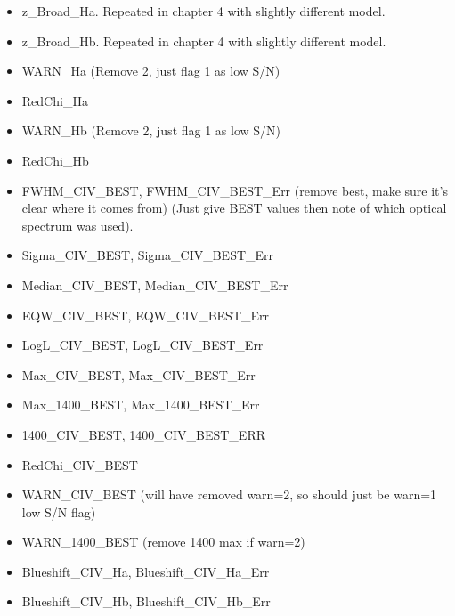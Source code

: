 \begin{itemize}
  \item[] z\_Broad\_Ha. Repeated in chapter 4 with slightly different model.

  \item[] z\_Broad\_Hb. Repeated in chapter 4 with slightly different model. 

  \item[] WARN\_Ha (Remove 2, just flag 1 as low S/N)

  \item[] RedChi\_Ha

  \item[] WARN\_Hb (Remove 2, just flag 1 as low S/N)

  \item[] RedChi\_Hb

  \item[] FWHM\_CIV\_BEST, FWHM\_CIV\_BEST\_Err (remove best, make sure it's clear where it comes from) (Just give BEST values then note of which optical spectrum was used). 

  \item[] Sigma\_CIV\_BEST, Sigma\_CIV\_BEST\_Err

  \item[] Median\_CIV\_BEST, Median\_CIV\_BEST\_Err

  \item[] EQW\_CIV\_BEST, EQW\_CIV\_BEST\_Err

  \item[] LogL\_CIV\_BEST, LogL\_CIV\_BEST\_Err

  \item[] Max\_CIV\_BEST, Max\_CIV\_BEST\_Err   

  \item[] Max\_1400\_BEST, Max\_1400\_BEST\_Err

  \item[] 1400\_CIV\_BEST, 1400\_CIV\_BEST\_ERR

  \item[] RedChi\_CIV\_BEST

  \item[] WARN\_CIV\_BEST (will have removed warn=2, so should just be warn=1 low S/N flag)

  \item[] WARN\_1400\_BEST (remove 1400 max if warn=2)

  \item[] Blueshift\_CIV\_Ha, Blueshift\_CIV\_Ha\_Err

  \item[] Blueshift\_CIV\_Hb, Blueshift\_CIV\_Hb\_Err




\end{itemize}

